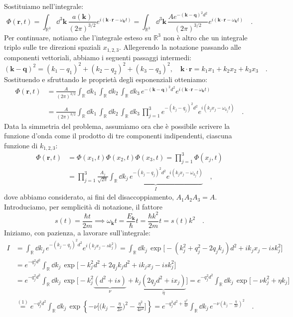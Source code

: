 Sostituiamo nell'integrale:
\[
    \Phi(\bm{r}, t) = \int_{\mathbb{R}^3} \dd^3{\bm{k}} \, \frac{a(\bm{k})}{(2\pi)^{3/2}} e^{i(\bm{k} \cdot \bm{r}-\omega_{\bm{k}} t)} = \int_{\mathbb{R}^3} \dd^3{\bm{k}} \, \frac{A e^{-(\bm{k}-\bm{q})^2 d^2}}{(2\pi)^{3/2}} e^{i(\bm{k} \cdot \bm{r}-\omega_{\bm{k}} t)} \quad.
\]
Per continuare, notiamo che l'integrale esteso su $\mathbb{R}^3$ non è altro che un integrale triplo sulle tre direzioni spaziali $x_{1,2,3}$. Allegerendo la notazione passando alle componenti vettoriali, abbiamo i seguenti passaggi intermedi:
\[
    (\bm{k}-\bm{q})^2 = (k_1 - q_1)^2 + (k_2 - q_2)^2 + (k_3 - q_3)^2, \quad \bm{k} \cdot \bm{r} = k_1x_1 + k_2x_2 + k_3x_3 \quad.
\]
Sostituendo e sfruttando le proprietà degli esponenziali otteniamo:
\[
\begin{aligned}
    \Phi(\bm{r}, t) &= \frac{A}{(2\pi)^{3/2}} \int_{\mathbb{R}} \dd{{k}_1} \, \int_{\mathbb{R}} \dd{{k}_2} \, \int_{\mathbb{R}} \dd{{k}_3} \,  e^{-(\bm{k}-\bm{q})^2 d^2} e^{i(\bm{k} \cdot \bm{r}-\omega_{\bm{k}} t)} \\
    &= \frac{A}{(2\pi)^{3/2}} \int_{\mathbb{R}} \dd{{k}_1} \, \int_{\mathbb{R}} \dd{{k}_2} \, \int_{\mathbb{R}} \dd{{k}_3} \, \prod_{j=1}^{3} e^{-({k}_j-{q}_j)^2 d^2} e^{i({k}_j {x}_j-\omega_{{k}_j} t)} \quad.
    \end{aligned}
\]
Data la simmetria del problema, assumiamo ora che è possibile scrivere la funzione d'onda come il prodotto di tre componenti indipendenti, ciascuna funzione di $k_{1,2,3}$:
\[
    \begin{aligned}
        \Phi(\bm{r}, t) &= \Phi(x_1, t) \Phi(x_2, t) \Phi(x_3, t)  = \prod_{j=1}^{3} \Phi(x_j, t) \\
        &= \prod_{j=1}^{3} \frac{A_j}{\sqrt{2\pi}} \underbrace{\int_{\mathbb{R}} \dd{{k}_j} \, e^{-({k}_j-{q}_j)^2 d^2} e^{i({k}_j {x}_j-\omega_{{k}_j} t)}}_I \quad,
    \end{aligned}
\]
dove abbiamo considerato, ai fini del disaccoppiamento, $A_1 A_2 A_3 = A$. Introduciamo, per semplicità di notazione, il fattore 
\[
    s(t) = \frac{\hbar t}{2m} \implies \omega_{\bm{k}} t = \frac{E_{\bm{k}}}{\hbar} t = \frac{\hbar k^2}{2m} t = s(t) k^2 \quad.
\]
Iniziamo, con pazienza, a lavorare sull'integrale:
\[
\begin{aligned}
    I &= \int_{\mathbb{R}} \dd{{k}_j} \, e^{-({k}_j-{q}_j)^2 d^2} e^{i({k}_j {x}_j-sk_j^2)} = \int_{\mathbb{R}} \dd{{k}_j} \, \exp\big[ -(k_j^2 + q_j^2 - 2q_jk_j)d^2 + ik_jx_j - isk_j^2 \big] \\
    &= e^{-q_j^2 d^2} \int_{\mathbb{R}} \dd{{k}_j} \, \exp\big[ -k_j^2d^2  + 2q_jk_jd^2 + ik_jx_j - isk_j^2 \big] \\
    &= e^{-q_j^2 d^2} \int_{\mathbb{R}} \dd{{k}_j} \, \exp\big[ -k_j^2\underbrace{(d^2 + is)}_{\nu}  +k_j \underbrace{( 2q_jd^2 + ix_j)}_{\eta}\big] = e^{-q_j^2 d^2} \int_{\mathbb{R}} \dd{{k}_j} \, \exp\big[ - \nu k_j^2 + \eta k_j \big] \\
    &\overset{(1)}{=} e^{-q_j^2 d^2} \int_{\mathbb{R}} \dd{{k}_j} \, \exp\left\{ -\nu\bigg[ \bigg( k_j - \frac{\eta}{2\nu} \bigg)^2 - \frac{\eta^2}{4\nu^2}  \bigg] \right\} = e^{-q_j^2 d^2 + \frac{\eta^2}{4\nu}} \int_{\mathbb{R}} \dd{{k}_j} \, e^{-\nu\left( k_j - \frac{\eta}{2\nu} \right)^2} \quad.
\end{aligned}
\]
